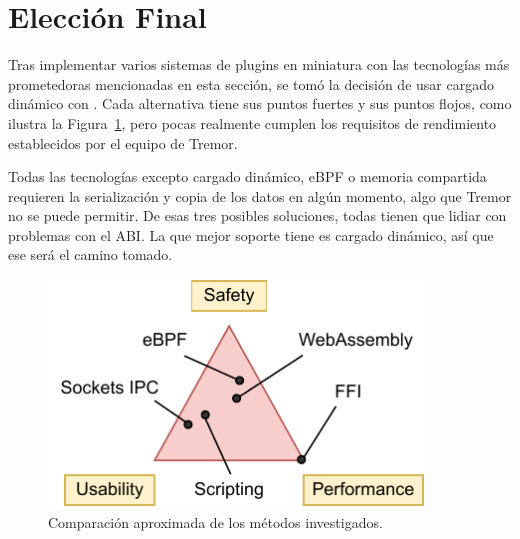 \section{Elección Final}

Tras implementar varios sistemas de plugins en miniatura con las tecnologías más
prometedoras mencionadas en esta sección, se tomó la decisión de usar cargado
dinámico con \abistable. Cada alternativa tiene sus puntos fuertes y sus puntos
flojos, como ilustra la Figura~\ref{fig:triangle}, pero pocas realmente
cumplen los requisitos de rendimiento establecidos por el equipo de Tremor.

Todas las tecnologías excepto cargado dinámico, eBPF o memoria compartida
requieren la serialización y copia de los datos en algún momento, algo que
Tremor no se puede permitir. De esas tres posibles soluciones, todas tienen que
lidiar con problemas con el ABI. La que mejor soporte tiene es cargado dinámico,
así que ese será el camino tomado.

\begin{figure}
    \centering
    \includegraphics[width=10cm]{./Imagenes/triangle.pdf}
    \caption{Comparación aproximada de los métodos investigados.}%
    \label{fig:triangle}
\end{figure}

